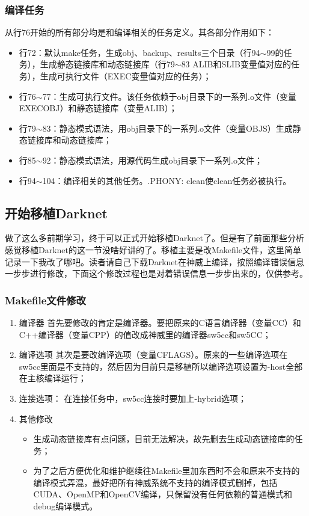 \subsubsection{编译任务}
从行76开始的所有部分均是和编译相关的任务定义。其各部分作用如下：
\begin{itemize}
    \item 行72：默认make任务，生成obj、backup、results三个目录（行94$\sim$99的任务），生成静态链接库和动态链接库（行79$\sim$83 ALIB和SLIB变量值对应的任务），生成可执行文件（EXEC变量值对应的任务）；
    \item 行76$\sim$77：生成可执行文件。该任务依赖于obj目录下的一系列.o文件（变量EXECOBJ）和静态链接库（变量ALIB）；
    \item 行79$\sim$83：静态模式语法，用obj目录下的一系列.o文件（变量OBJS）生成静态链接库和动态链接库；
    \item 行85$\sim$92：静态模式语法，用源代码生成obj目录下一系列.o文件；
    \item 行94$\sim$104：编译相关的其他任务。.PHONY: clean使clean任务必被执行。
\end{itemize}

\subsection{开始移植Darknet}
做了这么多前期学习，终于可以正式开始移植Darknet了。但是有了前面那些分析感觉移植Darknet的这一节没啥好讲的了。移植主要是改Makefile文件，这里简单记录一下我改了哪吧。读者请自己下载Darknet在神威上编译，按照编译错误信息一步步进行修改，下面这个修改过程也是对着错误信息一步步出来的，仅供参考。

\subsubsection{Makefile文件修改}
\begin{enumerate}
    \item 编译器
    首先要修改的肯定是编译器。要把原来的C语言编译器（变量CC）和C++编译器（变量CPP）的值改成神威里的编译器{\codefont sw5cc}和{\codefont sw5CC}；
    \item 编译选项
    其次是要改编译选项（变量CFLAGS）。原来的一些编译选项在{\codefont sw5cc}里面是不支持的，然后因为目前只是移植所以编译选项设置为{\codefont -host}全部在主核编译运行；
    \item 连接选项：
    在连接任务中，sw5cc连接时要加上{\codefont -hybrid}选项；
    \item 其他修改
    \begin{itemize}
        \item 生成动态链接库有点问题，目前无法解决，故先删去生成动态链接库的任务；
        \item 为了之后方便优化和维护继续往Makefile里加东西时不会和原来不支持的编译模式弄混，最好把所有神威系统不支持的编译模式删掉，包括CUDA、OpenMP和OpenCV编译，只保留没有任何依赖的普通模式和debug编译模式。
    \end{itemize}
\end{enumerate}

